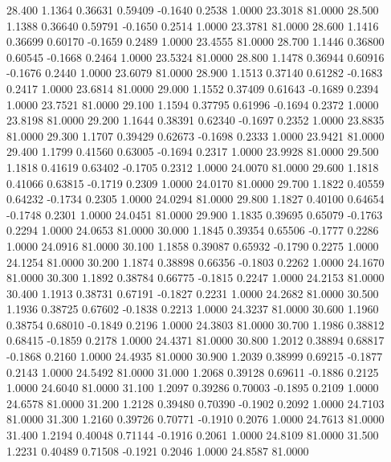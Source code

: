   28.400   1.1364   0.36631   0.59409  -0.1640   0.2538   1.0000  23.3018  81.0000
  28.500   1.1388   0.36640   0.59791  -0.1650   0.2514   1.0000  23.3781  81.0000
  28.600   1.1416   0.36699   0.60170  -0.1659   0.2489   1.0000  23.4555  81.0000
  28.700   1.1446   0.36800   0.60545  -0.1668   0.2464   1.0000  23.5324  81.0000
  28.800   1.1478   0.36944   0.60916  -0.1676   0.2440   1.0000  23.6079  81.0000
  28.900   1.1513   0.37140   0.61282  -0.1683   0.2417   1.0000  23.6814  81.0000
  29.000   1.1552   0.37409   0.61643  -0.1689   0.2394   1.0000  23.7521  81.0000
  29.100   1.1594   0.37795   0.61996  -0.1694   0.2372   1.0000  23.8198  81.0000
  29.200   1.1644   0.38391   0.62340  -0.1697   0.2352   1.0000  23.8835  81.0000
  29.300   1.1707   0.39429   0.62673  -0.1698   0.2333   1.0000  23.9421  81.0000
  29.400   1.1799   0.41560   0.63005  -0.1694   0.2317   1.0000  23.9928  81.0000
  29.500   1.1818   0.41619   0.63402  -0.1705   0.2312   1.0000  24.0070  81.0000
  29.600   1.1818   0.41066   0.63815  -0.1719   0.2309   1.0000  24.0170  81.0000
  29.700   1.1822   0.40559   0.64232  -0.1734   0.2305   1.0000  24.0294  81.0000
  29.800   1.1827   0.40100   0.64654  -0.1748   0.2301   1.0000  24.0451  81.0000
  29.900   1.1835   0.39695   0.65079  -0.1763   0.2294   1.0000  24.0653  81.0000
  30.000   1.1845   0.39354   0.65506  -0.1777   0.2286   1.0000  24.0916  81.0000
  30.100   1.1858   0.39087   0.65932  -0.1790   0.2275   1.0000  24.1254  81.0000
  30.200   1.1874   0.38898   0.66356  -0.1803   0.2262   1.0000  24.1670  81.0000
  30.300   1.1892   0.38784   0.66775  -0.1815   0.2247   1.0000  24.2153  81.0000
  30.400   1.1913   0.38731   0.67191  -0.1827   0.2231   1.0000  24.2682  81.0000
  30.500   1.1936   0.38725   0.67602  -0.1838   0.2213   1.0000  24.3237  81.0000
  30.600   1.1960   0.38754   0.68010  -0.1849   0.2196   1.0000  24.3803  81.0000
  30.700   1.1986   0.38812   0.68415  -0.1859   0.2178   1.0000  24.4371  81.0000
  30.800   1.2012   0.38894   0.68817  -0.1868   0.2160   1.0000  24.4935  81.0000
  30.900   1.2039   0.38999   0.69215  -0.1877   0.2143   1.0000  24.5492  81.0000
  31.000   1.2068   0.39128   0.69611  -0.1886   0.2125   1.0000  24.6040  81.0000
  31.100   1.2097   0.39286   0.70003  -0.1895   0.2109   1.0000  24.6578  81.0000
  31.200   1.2128   0.39480   0.70390  -0.1902   0.2092   1.0000  24.7103  81.0000
  31.300   1.2160   0.39726   0.70771  -0.1910   0.2076   1.0000  24.7613  81.0000
  31.400   1.2194   0.40048   0.71144  -0.1916   0.2061   1.0000  24.8109  81.0000
  31.500   1.2231   0.40489   0.71508  -0.1921   0.2046   1.0000  24.8587  81.0000
